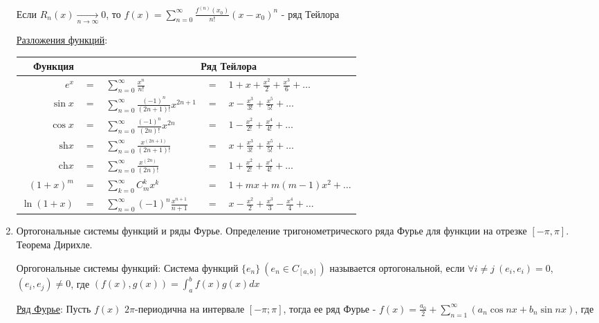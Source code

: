 \begin{enumerate}
    \Ths Если $R_n(x) \underset{n \to \infty}{\longrightarrow} 0$, то $f(x) = \sum_{n = 0}^\infty \frac{f^{(n)}(x_0)}{n!} (x - x_0)^n$ - ряд Тейлора

    \hyperlink{taylorsseriesoffunctions}{Разложения функций}:

    \begin{tabular}{rclcl}
        Функция & & \multicolumn{3}{c}{Ряд Тейлора} \\
        \hline
        $e^x$ & $=$ & $\sum_{n = 0}^\infty \frac{x^n}{n!}$ & $=$ & $1 + x + \frac{x^2}{2} + \frac{x^3}{6} + \dots$ \\
        \hline
        $\sin x$ & $=$ & $\sum_{n = 0}^\infty \frac{(-1)^n}{(2n + 1)!}x^{2n + 1}$ & $=$ & $x - \frac{x^3}{3!} + \frac{x^5}{5!} + \dots$ \\
        \hline
        $\cos x$ & $=$ & $\sum_{n = 0}^\infty \frac{(-1)^n}{(2n)!}x^{2n}$ & $=$ & $1 - \frac{x^2}{2!} + \frac{x^4}{4!} + \dots$ \\
        \hline
        $\mathrm{sh} x$ & $=$ & $\sum_{n = 0}^\infty \frac{x^{(2n + 1)}}{(2n + 1)!}$ & $=$ & $x + \frac{x^3}{3!} + \frac{x^5}{5!} + \dots$\\
        \hline
        $\mathrm{ch} x$ & $=$ & $\sum_{n = 0}^\infty \frac{x^{(2n)}}{(2n)!}$  & $=$ & $1 + \frac{x^2}{2!} + \frac{x^4}{4!} + \dots$\\
        \hline 
        $(1 + x)^m$ & $=$ & $\sum_{k = 0}^\infty C_m^k x^k$ & $=$ & $1 + mx + m(m - 1)x^2 + \dots$\\
        \hline
        $\ln(1 + x)$ & $=$ & $\sum_{n = 0}^\infty (-1)^n \frac{x^{n + 1}}{n + 1}$ & $=$ & $x - \frac{x^2}{2} + \frac{x^3}{3} - \frac{x^4}{4} + \dots$ \\
    \end{tabular}

    \item Ортогональные системы функций и ряды Фурье. Определение тригонометрического ряда
    Фурье для функции на отрезке $[-\pi, \pi]$. Теорема Дирихле.

    Оргогональные системы функций: 
    Система функций $\{e_n\} \ (e_n \in C_{[a, b]})$ называется ортогональной, 
    если $\forall i \neq j \ (e_i, e_i) = 0$, $(e_i, e_j) \neq 0$, где
    $(f(x), g(x)) = \int_{a}^{b} f(x) g(x) dx$

    \hyperlink{fouriersseries}{Ряд Фурье}: Пусть $f(x)$ $2\pi$-периодична на интервале $[-\pi;\pi]$, тогда ее ряд Фурье - $f(x) = \frac{a_0}{2} + \sum_{n = 1}^\infty (a_n \cos nx + b_n \sin nx)$, где 
    

\end{enumerate}
